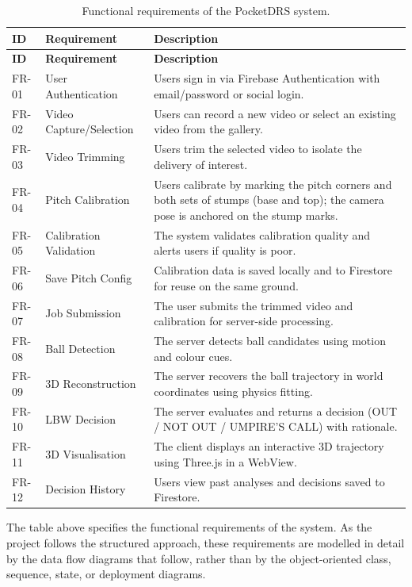 \documentclass[12pt,a4paper]{report}
\begin{document}
\begin{longtable}{|p{1.3cm}|p{4cm}|p{7.2cm}|}
\caption{Functional requirements of the PocketDRS system.}\\
\hline
\textbf{ID} & \textbf{Requirement} & \textbf{Description} \\
\hline
\endfirsthead
\hline
\textbf{ID} & \textbf{Requirement} & \textbf{Description} \\
\hline
\endhead
FR-01 & User Authentication & Users sign in via Firebase Authentication with email/password or social login. \\
\hline
FR-02 & Video Capture/Selection & Users can record a new video or select an existing video from the gallery. \\
\hline
FR-03 & Video Trimming & Users trim the selected video to isolate the delivery of interest. \\
\hline
FR-04 & Pitch Calibration & Users calibrate by marking the pitch corners and both sets of stumps (base and top); the camera pose is anchored on the stump marks. \\
\hline
FR-05 & Calibration Validation & The system validates calibration quality and alerts users if quality is poor. \\
\hline
FR-06 & Save Pitch Config & Calibration data is saved locally and to Firestore for reuse on the same ground. \\
\hline
FR-07 & Job Submission & The user submits the trimmed video and calibration for server-side processing. \\
\hline
FR-08 & Ball Detection & The server detects ball candidates using motion and colour cues. \\
\hline
FR-09 & 3D Reconstruction & The server recovers the ball trajectory in world coordinates using physics fitting. \\
\hline
FR-10 & LBW Decision & The server evaluates and returns a decision (OUT / NOT OUT / UMPIRE'S CALL) with rationale. \\
\hline
FR-11 & 3D Visualisation & The client displays an interactive 3D trajectory using Three.js in a WebView. \\
\hline
FR-12 & Decision History & Users view past analyses and decisions saved to Firestore. \\
\hline
\end{longtable}

The table above specifies the functional requirements of the system. As the project follows the structured approach, these requirements are modelled in detail by the data flow diagrams that follow, rather than by the object-oriented class, sequence, state, or deployment diagrams.
\end{document}
